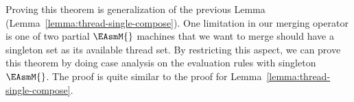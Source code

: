 Proving this theorem is generalization of the previous Lemma (Lemma~\ref{lemma:thread-single-compose}). 
One limitation in our merging operator is one of two partial $\EAsmM{}$ machines that we want to merge should have a singleton set as its available thread set. 
By restricting this aspect, we can 
prove this theorem by doing case analysis on the evaluation rules with singleton $\EAsmM{}$.
The proof is quite similar to the proof for Lemma~\ref{lemma:thread-single-compose}.



